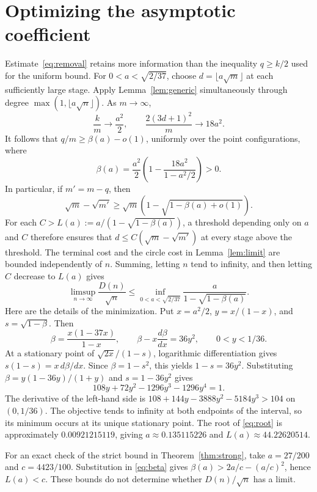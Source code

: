\documentclass[11pt,letterpaper]{article}
\begin{document}
\section{Optimizing the asymptotic coefficient}
Estimate~\eqref{eq:removal} retains more information than the inequality $q\geq k/2$ used for the uniform bound. For $0<a<\sqrt{2/37}$, choose $d=\lfloor a\sqrt m\rfloor$ at each sufficiently large stage. Apply Lemma~\ref{lem:generic} simultaneously through degree $\max(1,\lfloor a\sqrt n\rfloor)$. As $m\to\infty$,
\[
\frac km\longrightarrow\frac{a^2}2,\qquad
\frac{2(3d+1)^2}{m}\longrightarrow18a^2.
\]
It follows that $q/m\geq\beta(a)-o(1)$, uniformly over the point configurations, where
\begin{equation}\label{eq:beta}
\beta(a)=\frac{a^2}2\left(1-\frac{18a^2}{1-a^2/2}\right)>0.
\end{equation}
In particular, if $m'=m-q$, then
\[
\sqrt m-\sqrt{m'}\geq\sqrt m\left(1-\sqrt{1-\beta(a)+o(1)}\right).
\]
For each $C>L(a):=a/(1-\sqrt{1-\beta(a)})$, a threshold depending only on $a$ and $C$ therefore ensures that $d\leq C(\sqrt m-\sqrt{m'})$ at every stage above the threshold. The terminal cost and the circle cost in Lemma~\ref{lem:limit} are bounded independently of $n$. Summing, letting $n$ tend to infinity, and then letting $C$ decrease to $L(a)$ gives
\begin{equation}\label{eq:optimization}
\limsup_{n\to\infty}\frac{D(n)}{\sqrt n}
\leq\inf_{0<a<\sqrt{2/37}}\frac{a}{1-\sqrt{1-\beta(a)}}.
\end{equation}
Here are the details of the minimization. Put $x=a^2/2$, $y=x/(1-x)$, and $s=\sqrt{1-\beta}$. Then
\[
\beta=\frac{x(1-37x)}{1-x},\qquad
\beta-x\frac{d\beta}{dx}=36y^2,\qquad 0<y<1/36.
\]
At a stationary point of $\sqrt{2x}/(1-s)$, logarithmic differentiation gives $s(1-s)=x\,d\beta/dx$. Since $\beta=1-s^2$, this yields $1-s=36y^2$. Substituting $\beta=y(1-36y)/(1+y)$ and $s=1-36y^2$ gives
\begin{equation}\label{eq:root}
108y+72y^2-1296y^3-1296y^4=1.
\end{equation}
The derivative of the left-hand side is $108+144y-3888y^2-5184y^3>104$ on $(0,1/36)$. The objective tends to infinity at both endpoints of the interval, so its minimum occurs at its unique stationary point. The root of \eqref{eq:root} is approximately $0.00921215119$, giving $a\approx0.135115226$ and $L(a)\approx44.22620514$.

For an exact check of the strict bound in Theorem~\ref{thm:strong}, take $a=27/200$ and $c=4423/100$. Substitution in \eqref{eq:beta} gives $\beta(a)>2a/c-(a/c)^2$, hence $L(a)<c$. These bounds do not determine whether $D(n)/\sqrt n$ has a limit.
\end{document}
